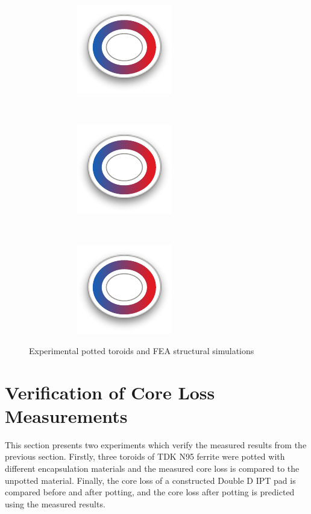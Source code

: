\documentclass[conference]{IEEEtran}
\begin{document}
\begin{figure}
\begin{subfigure}{\textwidth}
    \begin{subfigure}{0.3\textwidth}
      \centering
      \includegraphics{figures/featoroid.pdf}
      \caption{}
    \end{subfigure}~
    \begin{subfigure}{0.3\textwidth}
      \centering
      \includegraphics{figures/featoroid.pdf}
      \caption{}
    \end{subfigure}~
    \begin{subfigure}{0.3\textwidth}
      \centering
      \includegraphics{figures/featoroid.pdf}
      \caption{}
    \end{subfigure}
  \end{subfigure}
  \caption{Experimental potted toroids and FEA structural simulations}
  \label{fig:pottedtoroids}
\end{figure}


\section{Verification of Core Loss Measurements}
\label{sec:simulation}

This section presents two experiments which verify the measured results from the previous section. 
Firstly, three toroids of TDK N95 ferrite were potted with different encapsulation materials and the measured core loss is compared to the unpotted material. 
Finally, the core loss of a constructed Double D IPT pad is compared before and after potting, and the core loss after potting is predicted using the measured results. 
\end{document}
